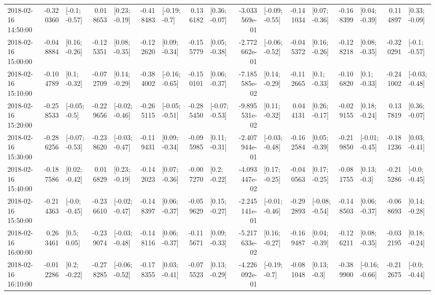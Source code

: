 \begin{tabular}{lrlrlrlrlrlrlrlrl}
2018-02-16 14:50:00 & -0.320360 &   [-0.1; -0.57] &  0.018653 &   [0.23; -0.19] & -0.418483 &   [-0.19; -0.7] &  0.136182 &   [0.36; -0.07] & -3.033569e-01 &  [-0.09; -0.55] & -0.141034 &   [0.07; -0.36] & -0.168399 &   [0.04; -0.39] &  0.114897 &   [0.33; -0.09] \\
2018-02-16 15:00:00 & -0.048884 &   [0.16; -0.26] & -0.125351 &   [0.08; -0.35] & -0.122620 &   [0.09; -0.34] & -0.155779 &   [0.05; -0.38] & -2.772662e-01 &  [-0.06; -0.52] & -0.045372 &   [0.16; -0.26] & -0.128218 &   [0.08; -0.35] & -0.320291 &   [-0.1; -0.57] \\
2018-02-16 15:10:00 & -0.104789 &    [0.1; -0.32] & -0.072709 &   [0.14; -0.29] & -0.384002 &  [-0.16; -0.65] & -0.150101 &   [0.06; -0.37] & -7.185585e-02 &   [0.14; -0.29] & -0.112665 &    [0.1; -0.33] & -0.106820 &    [0.1; -0.33] & -0.241002 &  [-0.03; -0.48] \\
2018-02-16 15:20:00 & -0.258533 &   [-0.05; -0.5] & -0.229656 &  [-0.02; -0.46] & -0.265115 &  [-0.05; -0.51] & -0.285450 &  [-0.07; -0.53] & -9.895531e-02 &   [0.11; -0.32] &  0.044131 &   [0.26; -0.17] & -0.029155 &   [0.18; -0.24] &  0.137819 &   [0.36; -0.07] \\
2018-02-16 15:30:00 & -0.286256 &  [-0.07; -0.53] & -0.238620 &  [-0.03; -0.47] & -0.119431 &   [0.09; -0.34] & -0.095985 &   [0.11; -0.31] & -2.407944e-01 &  [-0.03; -0.48] & -0.162584 &   [0.05; -0.39] & -0.219850 &  [-0.01; -0.45] & -0.181236 &   [0.03; -0.41] \\
2018-02-16 15:40:00 & -0.187586 &   [0.02; -0.42] &  0.016829 &   [0.23; -0.19] & -0.142023 &   [0.07; -0.36] & -0.007270 &    [0.2; -0.22] & -4.093447e-02 &   [0.17; -0.25] & -0.040563 &   [0.17; -0.25] & -0.081755 &    [0.13; -0.3] & -0.215286 &   [-0.0; -0.45] \\
2018-02-16 15:50:00 & -0.214363 &   [-0.0; -0.45] & -0.236610 &  [-0.02; -0.47] & -0.148397 &   [0.06; -0.37] & -0.059629 &   [0.15; -0.27] & -2.245141e-01 &  [-0.01; -0.46] & -0.292893 &  [-0.08; -0.54] & -0.148503 &   [0.06; -0.37] & -0.068693 &   [0.14; -0.28] \\
2018-02-16 16:00:00 &  0.263461 &     [0.5; 0.05] & -0.239074 &  [-0.03; -0.48] & -0.148116 &   [0.06; -0.37] & -0.115671 &   [0.09; -0.33] & -5.217633e-02 &   [0.16; -0.27] & -0.169487 &   [0.04; -0.39] & -0.126211 &   [0.08; -0.35] & -0.032195 &   [0.18; -0.24] \\
2018-02-16 16:10:00 & -0.012286 &    [0.2; -0.22] & -0.278285 &  [-0.06; -0.52] & -0.178355 &   [0.03; -0.41] & -0.075523 &   [0.13; -0.29] & -4.226092e-01 &   [-0.19; -0.7] & -0.081048 &    [0.13; -0.3] & -0.389900 &  [-0.16; -0.66] & -0.212675 &   [-0.0; -0.44] \\

\end{tabular}
